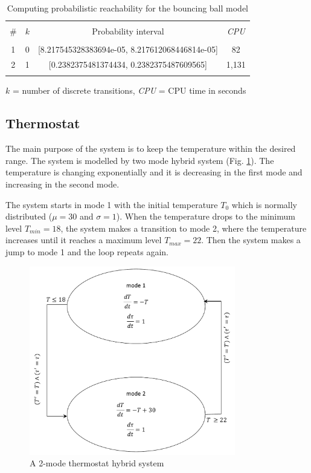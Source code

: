 \begin{table}[ht] 
\caption{Computing probabilistic reachability for the bouncing ball model}
\centering
\begin{tabular}{c c c c}
\hline\hline \\ [0.5ex]
\# & $k$ & Probability interval & {\em CPU}\\ [0.5ex] 

\hline \\ [0.5ex]
1 & 0 & [8.217545328383694e-05, 8.217612068446814e-05] & 82\\ [0.5ex]
2 & 1 & [0.2382375481374434, 0.2382375487609565] & 1,131\\ [0.5ex] 
\hline \\ [0.5ex]
\end{tabular} 

$k$ = number of discrete transitions, {\em CPU} = CPU time in seconds
\label{table:bouncing-ball} 
\end{table} 


\subsection{Thermostat} 
The main purpose of the system is to keep the temperature within the desired range. 
The system is modelled by two mode hybrid system \cite{DBLP:conf/hybrid/AlurCHH92} 
(Fig. \ref{fig:thermostat-2m}). The temperature is changing exponentially and it is 
decreasing in the first mode and increasing in the second mode.

The system starts in mode 1 with the initial temperature $T_{0}$ which is normally 
distributed ($\mu = 30$ and $\sigma = 1$). When the temperature drops to the minimum 
level $T_{min} = 18$, the system makes a transition to mode 2, where the temperature 
increases until it reaches a maximum level $T_{max} = 22$. Then the system makes a 
jump to mode 1 and the loop repeats again.

\begin{figure}[ht!] 
\centering
\includegraphics[width=90mm]{thermostat-2m}
\caption{A 2-mode thermostat hybrid system}
\label{fig:thermostat-2m}
\end{figure}

